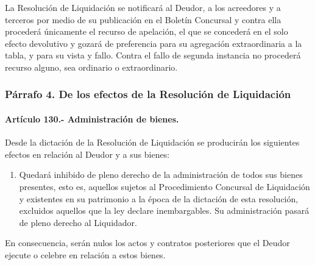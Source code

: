 \documentclass[
]{book}
\providecommand{\tightlist}{%
  \setlength{\itemsep}{0pt}\setlength{\parskip}{0pt}}
\begin{document}
La Resolución de Liquidación se notificará al Deudor, a los acreedores y a terceros por medio de su publicación en el Boletín Concursal y contra ella procederá únicamente el recurso de apelación, el que se concederá en el solo efecto devolutivo y gozará de preferencia para su agregación extraordinaria a la tabla, y para su vista y fallo. Contra el fallo de segunda instancia no procederá recurso alguno, sea ordinario o extraordinario.

\hypertarget{puxe1rrafo-4.-de-los-efectos-de-la-resoluciuxf3n-de-liquidaciuxf3n}{%
\subsubsection*{Párrafo 4. De los efectos de la Resolución de Liquidación}\label{puxe1rrafo-4.-de-los-efectos-de-la-resoluciuxf3n-de-liquidaciuxf3n}}

\hypertarget{artuxedculo-130.--administraciuxf3n-de-bienes.}{%
\paragraph*{Artículo 130.- Administración de bienes.}\label{artuxedculo-130.--administraciuxf3n-de-bienes.}}

Desde la dictación de la Resolución de Liquidación se producirán los siguientes efectos en relación al Deudor y a sus bienes:

\begin{enumerate}
\def\labelenumi{\arabic{enumi})}
\tightlist
\item
  Quedará inhibido de pleno derecho de la administración de todos sus bienes presentes, esto es, aquellos sujetos al Procedimiento Concursal de Liquidación y existentes en su patrimonio a la época de la dictación de esta resolución, excluidos aquellos que la ley declare inembargables. Su administración pasará de pleno derecho al Liquidador.
\end{enumerate}

En consecuencia, serán nulos los actos y contratos posteriores que el Deudor ejecute o celebre en relación a estos bienes.
\end{document}
